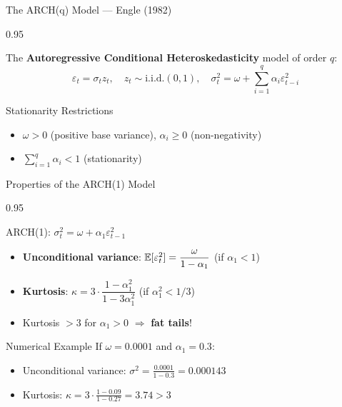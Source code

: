 \documentclass[9pt, aspectratio=169, t]{beamer}
\begin{document}
\begin{frame}{The ARCH(q) Model --- Engle (1982)}
    \begin{cminipage}{0.95\textwidth}
    \small
    \begin{defn}[ARCH(q)]
        The \textbf{Autoregressive Conditional Heteroskedasticity} model of order $q$:
        \[
            \varepsilon_t = \sigma_t z_t, \quad z_t \sim \text{i.i.d.}(0, 1), \quad
            \sigma_t^2 = \omega + \sum_{i=1}^{q} \alpha_i \varepsilon_{t-i}^2
        \]
    \end{defn}

    \vspace{0.2cm}

    \begin{block}{Stationarity Restrictions}
        \begin{itemize}\setlength{\itemsep}{0pt}
            \item $\omega > 0$ (positive base variance), \quad $\alpha_i \geq 0$ (non-negativity)
            \item $\sum_{i=1}^{q} \alpha_i < 1$ (stationarity)
        \end{itemize}
    \end{block}

    \end{cminipage}
\end{frame}

\begin{frame}{Properties of the ARCH(1) Model}
    \begin{cminipage}{0.95\textwidth}
    \begin{block}{ARCH(1): $\sigma_t^2 = \omega + \alpha_1 \varepsilon_{t-1}^2$}
        \begin{itemize}\setlength{\itemsep}{0pt}
            \item \textbf{Unconditional variance}: $\mathbb{E}[\varepsilon_t^2] = \dfrac{\omega}{1 - \alpha_1}$ (if $\alpha_1 < 1$)
            \item \textbf{Kurtosis}: $\kappa = 3 \cdot \dfrac{1 - \alpha_1^2}{1 - 3\alpha_1^2}$ (if $\alpha_1^2 < 1/3$)
            \item Kurtosis $> 3$ for $\alpha_1 > 0$ $\Rightarrow$ \textbf{fat tails}!
        \end{itemize}
    \end{block}

    \vspace{0.3cm}

    \begin{exampleblock}{Numerical Example}
        If $\omega = 0.0001$ and $\alpha_1 = 0.3$:
        \begin{itemize}\setlength{\itemsep}{0pt}
            \item Unconditional variance: $\sigma^2 = \frac{0.0001}{1 - 0.3} = 0.000143$
            \item Kurtosis: $\kappa = 3 \cdot \frac{1 - 0.09}{1 - 0.27} = 3.74 > 3$
        \end{itemize}
    \end{exampleblock}
    \end{cminipage}
\end{frame}
\end{document}
